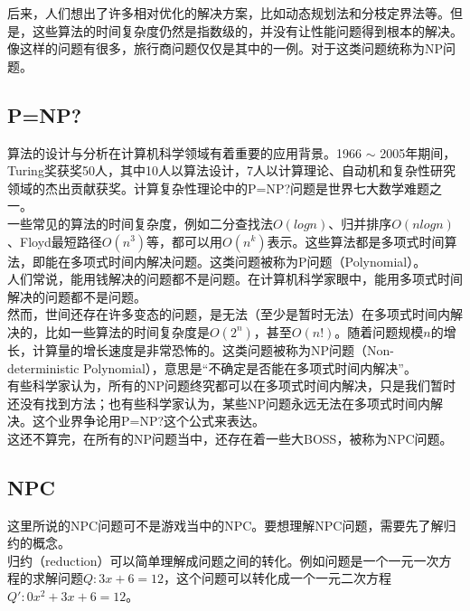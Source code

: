 后来，人们想出了许多相对优化的解决方案，比如动态规划法和分枝定界法等。但是，这些算法的时间复杂度仍然是指数级的，并没有让性能问题得到根本的解决。\\

像这样的问题有很多，旅行商问题仅仅是其中的一例。对于这类问题统称为NP问题。\\

\subsection{P=NP?}

算法的设计与分析在计算机科学领域有着重要的应用背景。1966 $ \sim $ 2005年期间，Turing奖获奖50人，其中10人以算法设计，7人以计算理论、自动机和复杂性研究领域的杰出贡献获奖。计算复杂性理论中的P=NP?问题是世界七大数学难题之一。\\

一些常见的算法的时间复杂度，例如二分查找法$ O(logn) $、归并排序$ O(nlogn) $、Floyd最短路径$ O(n^3) $等，都可以用$ O(n^k) $表示。这些算法都是多项式时间算法，即能在多项式时间内解决问题。这类问题被称为P问题（Polynomial）。\\

人们常说，能用钱解决的问题都不是问题。在计算机科学家眼中，能用多项式时间解决的问题都不是问题。\\

然而，世间还存在许多变态的问题，是无法（至少是暂时无法）在多项式时间内解决的，比如一些算法的时间复杂度是$ O(2^n) $，甚至$ O(n!) $。随着问题规模$ n $的增长，计算量的增长速度是非常恐怖的。这类问题被称为NP问题（Non-deterministic Polynomial），意思是“不确定是否能在多项式时间内解决”。\\

有些科学家认为，所有的NP问题终究都可以在多项式时间内解决，只是我们暂时还没有找到方法；也有些科学家认为，某些NP问题永远无法在多项式时间内解决。这个业界争论用P=NP?这个公式来表达。\\

这还不算完，在所有的NP问题当中，还存在着一些大BOSS，被称为NPC问题。\\

\subsection{NPC}

这里所说的NPC问题可不是游戏当中的NPC。要想理解NPC问题，需要先了解归约的概念。\\

归约（reduction）可以简单理解成问题之间的转化。例如问题是一个一元一次方程的求解问题$ Q: 3x + 6 = 12 $，这个问题可以转化成一个一元二次方程$ Q': 0x^2 + 3x + 6 = 12 $。\\

